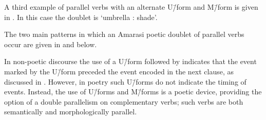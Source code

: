 A third example of parallel verbs with an alternate U\=/form and M\=/form
is given in .
In this case the doublet is  `umbrella : shade'.

\newpage
\begin{exe}
	\label{ex:130825-3, 1.15-1.21}
	\begin{xlist}
		\vspace{4pt}
	\end{xlist}
\end{exe}

The two main patterns in which an Amarasi poetic doublet
of parallel verbs occur are given
in  and  below.

\begin{exe}
	\label{ex:AmaParVerPai}
	\label{ex:AmaParVerPai2}
\end{exe}

In non-poetic discourse the use of a U\=/form followed by 
indicates that the event marked by the U\=/form preceded the
event encoded in the next clause, as discussed in .
However, in poetry such U\=/forms do not indicate the timing of events.
Instead, the use of U\=/forms and M\=/forms is a poetic device,
providing the option of a double parallelism on complementary verbs;
such verbs are both semantically and morphologically parallel.
